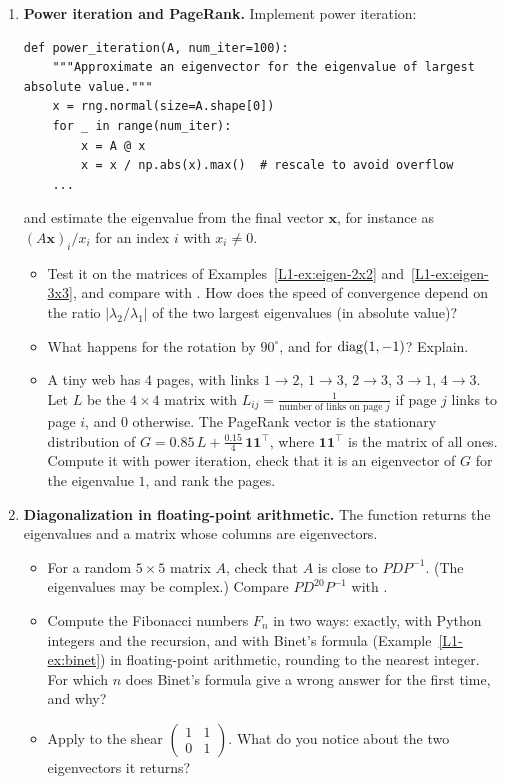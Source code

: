 \begin{enumerate}[label=\textbf{P\arabic*.}, leftmargin=*]
    \item \textbf{Power iteration and PageRank.} Implement power iteration:
\begin{lstlisting}
def power_iteration(A, num_iter=100):
    """Approximate an eigenvector for the eigenvalue of largest absolute value."""
    x = rng.normal(size=A.shape[0])
    for _ in range(num_iter):
        x = A @ x
        x = x / np.abs(x).max()  # rescale to avoid overflow
    ...
\end{lstlisting}
    and estimate the eigenvalue from the final vector $\mathbf{x}$, for instance as $(A\mathbf{x})_i / x_i$ for an index $i$ with $x_i \neq 0$.
    \begin{itemize}
        \item Test it on the matrices of Examples~\ref{L1-ex:eigen-2x2} and~\ref{L1-ex:eigen-3x3}, and compare with . How does the speed of convergence depend on the ratio $|\lambda_2 / \lambda_1|$ of the two largest eigenvalues (in absolute value)?
        \item What happens for the rotation by $90^\circ$, and for $\operatorname{diag}(1, -1)$? Explain.
        \item A tiny web has $4$ pages, with links $1 \to 2$, $1 \to 3$, $2 \to 3$, $3 \to 1$, $4 \to 3$. Let $L$ be the $4 \times 4$ matrix with $L_{ij} = \frac{1}{\text{number of links on page } j}$ if page $j$ links to page $i$, and $0$ otherwise. The PageRank vector is the stationary distribution of $G = 0.85\,L + \frac{0.15}{4}\,\mathbf{1}\mathbf{1}^\top$, where $\mathbf{1}\mathbf{1}^\top$ is the matrix of all ones. Compute it with power iteration, check that it is an eigenvector of $G$ for the eigenvalue $1$, and rank the pages.
    \end{itemize}

    \item \textbf{Diagonalization in floating-point arithmetic.} The function  returns the eigenvalues and a matrix  whose columns are eigenvectors.
    \begin{itemize}
        \item For a random $5 \times 5$ matrix $A$, check that $A$ is close to $PDP^{-1}$. (The eigenvalues may be complex.) Compare $PD^{20}P^{-1}$ with .
        \item Compute the Fibonacci numbers $F_n$ in two ways: exactly, with Python integers and the recursion, and with Binet's formula (Example~\ref{L1-ex:binet}) in floating-point arithmetic, rounding to the nearest integer. For which $n$ does Binet's formula give a wrong answer for the first time, and why?
        \item Apply  to the shear $\begin{pmatrix} 1 & 1 \\ 0 & 1 \end{pmatrix}$. What do you notice about the two eigenvectors it returns?
    \end{itemize}


\end{enumerate}
